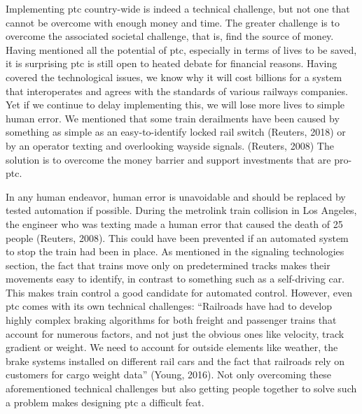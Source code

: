 \documentclass[11pt, titlepage]{article}
\begin{document}
Implementing \gls{ptc} country-wide is indeed a technical challenge, but not one
that cannot be overcome with enough money and time. The greater challenge is to
overcome the associated societal challenge, that is, find the source of money.
Having mentioned all the potential of \gls{ptc}, especially in terms of lives to
be saved, it is surprising \gls{ptc} is still open to heated debate for financial
reasons. Having covered the technological issues, we know why it will cost
billions for a system that interoperates and agrees with the standards of various
railways companies. Yet if we continue to delay implementing this, we will lose
more lives to simple human error. We mentioned that some train derailments have
been caused by something as simple as an easy-to-identify locked rail switch
(Reuters, 2018) or by an operator texting and overlooking wayside signals.
(Reuters, 2008) The solution is to overcome the money barrier and support
investments that are pro-\gls{ptc}.

In any human endeavor, human error is unavoidable and should be replaced by tested
automation if possible. During the \gls{metrolink} train collision in Los Angeles,
the engineer who was texting made a human error that caused the death of 25
people (Reuters, 2008). This could have been prevented if an automated system to
stop the train had been in place. As mentioned in the signaling technologies
section, the fact that trains move only on predetermined tracks makes their
movements easy to identify, in contrast to something such as a self-driving car.
This makes train control a good candidate for automated control. However, even
\gls{ptc} comes with its own technical challenges: ``Railroads have had to develop
highly complex braking algorithms for both freight and passenger trains that
account for numerous factors, and not just the obvious ones like velocity, track
gradient or weight. We need to account for outside elements like weather, the
brake systems installed on different rail cars and the fact that railroads rely on
customers for cargo weight data'' (Young, 2016). Not only overcoming these
aforementioned technical challenges but also getting people together to solve such
a problem makes designing \gls{ptc} a difficult feat.
\end{document}
